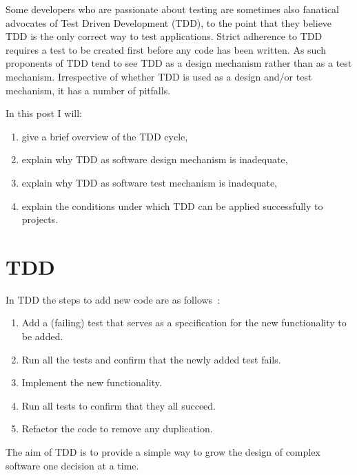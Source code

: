 \documentclass{amsart}
\title{}
\author{}
\date{}
\begin{document}
  \maketitle
  
  Some developers who are passionate about testing are sometimes also fanatical advocates of Test Driven Development (TDD), to the point that they believe TDD is the only correct way to test applications. Strict adherence to TDD requires a test to be created first before any code has been written. As such proponents of TDD tend to see TDD as a design mechanism rather than as a test mechanism. Irrespective of whether TDD is used as a design and/or test mechanism, it has a number of pitfalls.

  In this post I will:
  \begin{enumerate}
   \item give a brief overview of the TDD cycle,
   \item explain why TDD as software design mechanism is inadequate,
   \item explain why TDD as software test mechanism is inadequate,
   \item explain the conditions under which TDD can be applied successfully to projects.
  \end{enumerate}

  \section{TDD}
  In TDD the steps to add new code are as follows~\cite{Beck2003}:
  \begin{enumerate}
   \item Add a (failing) test that serves as a specification for the new functionality to be added.
   \item Run all the tests and confirm that the newly added test fails.
   \item Implement the new functionality.
   \item Run all tests to confirm that they all succeed.
   \item Refactor the code to remove any duplication.
  \end{enumerate}

  The aim of TDD is to provide a simple way to grow the design of complex software one decision at a time.
  
\end{document}

